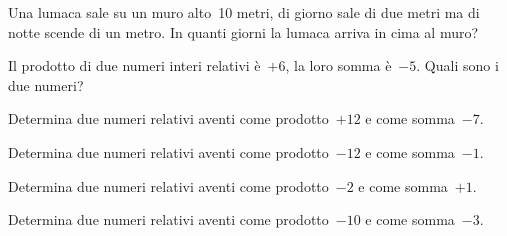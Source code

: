 \begin{htmulticols}{2}

\begin{esercizio}
 Una lumaca sale su un muro alto~10 metri, di giorno sale di due metri ma di 
notte
scende di un metro. In quanti giorni la lumaca arriva in cima al muro?
\end{esercizio}

% 

\begin{esercizio}
Il prodotto di due numeri interi relativi è~\(+6\), la loro somma è~\(-5\). 
Quali sono i due numeri? 
\end{esercizio}

\begin{esercizio}
Determina due numeri relativi aventi come prodotto~\(+12\) e come 
somma~\(-7\). 
\end{esercizio}

\begin{esercizio}
Determina due numeri relativi aventi come prodotto~\(-12\) e come 
somma~\(-1\). 
\end{esercizio}

\begin{esercizio}
Determina due numeri relativi aventi come prodotto~\(-2\) e come 
somma~\(+1\). 
\end{esercizio}

\begin{esercizio}
Determina due numeri relativi aventi come prodotto~\(-10\) e come 
somma~\(-3\). 
\end{esercizio}


\end{htmulticols}
